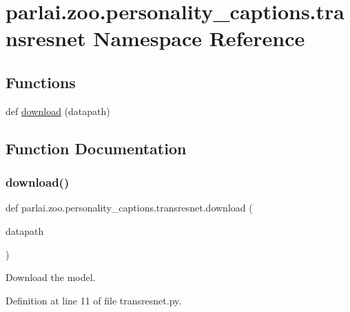 \hypertarget{namespaceparlai_1_1zoo_1_1personality__captions_1_1transresnet}{}\section{parlai.\+zoo.\+personality\+\_\+captions.\+transresnet Namespace Reference}
\label{namespaceparlai_1_1zoo_1_1personality__captions_1_1transresnet}
\subsection*{Functions}
\begin{DoxyCompactItemize}
\item 
def \hyperlink{namespaceparlai_1_1zoo_1_1personality__captions_1_1transresnet_a3bc7fd4d2fb757f3481c3dab3355ef12}{download} (datapath)
\end{DoxyCompactItemize}


\subsection{Function Documentation}
\mbox{\label{namespaceparlai_1_1zoo_1_1personality__captions_1_1transresnet_a3bc7fd4d2fb757f3481c3dab3355ef12}} 
\subsubsection{\texorpdfstring{download()}{download()}}
{\footnotesize\ttfamily def parlai.\+zoo.\+personality\+\_\+captions.\+transresnet.\+download (\begin{DoxyParamCaption}\item[{}]{datapath }\end{DoxyParamCaption})}

\begin{DoxyVerb}Download the model.\end{DoxyVerb}
 

Definition at line 11 of file transresnet.\+py.



